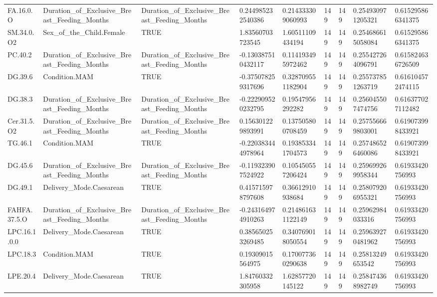 \begin{longtable}{lllllllll}
FA.16.0.O & Duration\_of\_Exclusive\_Breast\_Feeding\_Months & Duration\_of\_Exclusive\_Breast\_Feeding\_Months & 0.244985232540386 & 0.214333309060993 & 149 & 149 & 0.254930971205321 & 0.615295866341375 \\
SM.34.0.O2 & Sex\_of\_the\_Child.Female & TRUE & 1.83560703723545 & 1.60511109434194 & 149 & 149 & 0.254686615058084 & 0.615295866341375 \\
PC.40.2 & Duration\_of\_Exclusive\_Breast\_Feeding\_Months & Duration\_of\_Exclusive\_Breast\_Feeding\_Months & -0.130387510432117 & 0.114193495972462 & 149 & 149 & 0.255427264096791 & 0.615824636726509 \\
DG.39.6 & Condition.MAM & TRUE & -0.375078259317696 & 0.328709551182904 & 149 & 149 & 0.255737851263719 & 0.616104572474115 \\
DG.38.3 & Duration\_of\_Exclusive\_Breast\_Feeding\_Months & Duration\_of\_Exclusive\_Breast\_Feeding\_Months & -0.222909520232795 & 0.19547956292282 & 149 & 149 & 0.256045507474756 & 0.616377027112482 \\
Cer.31.5.O2 & Duration\_of\_Exclusive\_Breast\_Feeding\_Months & Duration\_of\_Exclusive\_Breast\_Feeding\_Months & 0.156301229893991 & 0.137505800708459 & 149 & 149 & 0.257556669803001 & 0.619073998433921 \\
TG.46.1 & Condition.MAM & TRUE & -0.220383444978964 & 0.193853341704573 & 149 & 149 & 0.257486526460086 & 0.619073998433921 \\
DG.45.6 & Duration\_of\_Exclusive\_Breast\_Feeding\_Months & Duration\_of\_Exclusive\_Breast\_Feeding\_Months & -0.119323907524922 & 0.105450557206424 & 149 & 149 & 0.259699269958344 & 0.61933420756993 \\
DG.49.1 & Delivery\_Mode.Caesarean & TRUE & 0.415715978797608 & 0.36612910938684 & 149 & 149 & 0.258079206955321 & 0.61933420756993 \\
FAHFA.37.5.O & Duration\_of\_Exclusive\_Breast\_Feeding\_Months & Duration\_of\_Exclusive\_Breast\_Feeding\_Months & -0.243164974910263 & 0.214861631122149 & 149 & 149 & 0.25962984033316 & 0.61933420756993 \\
LPC.16.1.0.0 & Delivery\_Mode.Caesarean & TRUE & 0.385650253269485 & 0.340769018050554 & 149 & 149 & 0.259639270481962 & 0.61933420756993 \\
LPC.18.3 & Condition.MAM & TRUE & 0.19309015564975 & 0.170077360290638 & 149 & 149 & 0.25813249653542 & 0.61933420756993 \\
LPE.20.4 & Delivery\_Mode.Caesarean & TRUE & 1.84760332305958 & 1.62857720145122 & 149 & 149 & 0.258474368982749 & 0.61933420756993 \\

\end{longtable}

